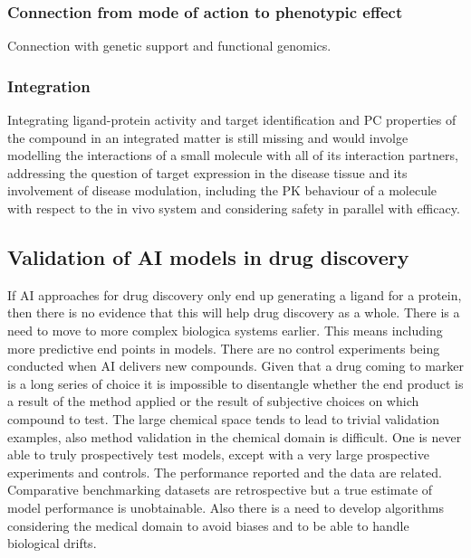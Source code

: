 		\subsubsection{Connection from mode of action to phenotypic effect}
		Connection with genetic support and functional genomics.

		\subsubsection{Integration}
		Integrating ligand-protein activity and target identification and PC properties of the compound in an integrated matter is still missing and would involge modelling the interactions of a small molecule with all of its interaction partners, addressing the question of target expression in the disease tissue and its involvement of disease modulation, including the PK behaviour of a molecule with respect to the in vivo system and considering safety in parallel with efficacy.

	\subsection{Validation of AI models in drug discovery}
	If AI approaches for drug discovery only end up generating a ligand for a protein, then there is no evidence that this will help drug discovery as a whole.
	There is a need to move to more complex biologica systems earlier.
	This means including more predictive end points in models.
	There are no control experiments being conducted when AI delivers new compounds.
	Given that a drug coming to marker is a long series of choice it is impossible to disentangle whether the end product is a result of the method applied or the result of subjective choices on which compound to test.
	The large chemical space tends to lead to trivial validation examples, also method validation in the chemical domain is difficult.
	One is never able to truly prospectively test models, except with a very large prospective experiments and controls.
	The performance reported and the data are related.
	Comparative benchmarking datasets are retrospective but a true estimate of model performance is unobtainable.
	Also there is a need to develop algorithms considering the medical domain to avoid biases and to be able to handle biological drifts.
